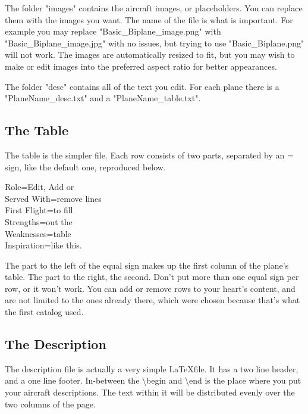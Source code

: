 \documentclass{article}
\begin{document}
The folder "images" contains the aircraft images, or placeholders.  You can replace them with the images you want.  The name of the file is what is important.  For example you may replace "Basic\_Biplane\_image.png" with "Basic\_Biplane\_image.jpg" with no issues, but trying to use "Basic\_Biplane.png" will not work.  The images are automatically resized to fit, but you may wish to make or edit images into the preferred aspect ratio for better appearances.

The folder "desc" contains all of the text you edit.  For each plane there is a "PlaneName\_desc.txt" and a "PlaneName\_table.txt".

\subsection{The Table}
The table is the simpler file.  Each row consists of two parts, separated by an = sign, like the default one, reproduced below.
\begin{displayquote}
        Role=Edit, Add or\\
        Served With=remove lines\\
        First Flight=to fill\\
        Strengths=out the\\
        Weaknesses=table\\
        Inspiration=like this.\\
\end{displayquote}
The part to the left of the equal sign makes up the first column of the plane's table.  The part to the right, the second.  Don't put more than one equal sign per row, or it won't work.  You can add or remove rows to your heart's content, and are not limited to the ones already there, which were chosen because that's what the first catalog used.

\subsection{The Description}
The description file is actually a very simple \LaTeX file.  It has a two line header, and a one line footer.  In-between the \textbackslash begin and \textbackslash end is the place where you put your aircraft descriptions.  The text within it will be distributed evenly over the two columns of the page.
\end{document}
